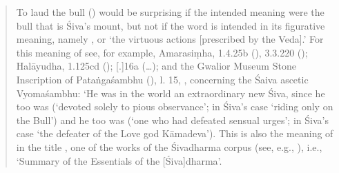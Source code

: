 \begin{quote}
To laud the bull () 
would be surprising if the intended meaning were 
the bull that is Śiva's mount, but not if the word is intended in its figurative meaning, namely , 
or  `the virtuous actions [prescribed by
the Veda].' For this meaning of  see, for example,
Amarasiṃha,  
1.4.25b (),
3.3.220 (); 
Halāyudha,
 1.125cd (); 
\Manu{}[.]16a
(\dots); 
and the Gwalior Museum Stone
Inscription of Pataṅgaśambhu (), l. 15,
, 
concerning the Śaiva ascetic Vyomaśambhu: 
`He was in the
world an extraordinary new Śiva, since he too was 
(`devoted solely to pious observance'; 
in Śiva's case `riding only on the Bull') and he too was 
 (`one who had defeated sensual
urges'; in Śiva's case `the defeater of the Love god Kāmadeva'). 
This is also the meaning of  in the title \Vss,
one of the works of the Śivadharma corpus 
(see, e.g., ), i.e., 
`Summary of the Essentials of the [Śiva]dharma'. 
\end{quote}

